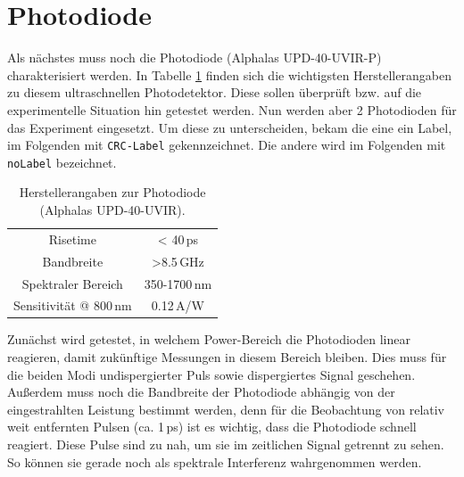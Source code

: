 \documentclass[bachelor,       %
               twoside,        %
               BCOR10mm,       %
               english,ngerman, %
               ]{GAUBM}
\begin{document}
\section{Photodiode}
Als nächstes muss noch die Photodiode (Alphalas UPD-40-UVIR-P) charakterisiert werden.
In Tabelle \ref{tab:PD} finden sich die wichtigsten Herstellerangaben zu diesem ultraschnellen Photodetektor.
Diese sollen überprüft bzw. auf die experimentelle Situation hin getestet werden.
Nun werden aber 2 Photodioden für das Experiment eingesetzt.
Um diese zu unterscheiden, bekam die eine ein Label, im Folgenden mit \texttt{CRC-Label} gekennzeichnet.
Die andere wird im Folgenden mit \texttt{noLabel} bezeichnet.
\begin{table}[!htb]
	\centering
	\begin{tabular}{|c|c|}
		\hline
		Risetime & < 40\,ps \\
		Bandbreite & >8.5\,GHz \\
		Spektraler Bereich & 350-1700\,nm \\
		Sensitivität @ 800\,nm & 0.12\,A/W\\
		\hline	
	\end{tabular}
	\caption{Herstellerangaben zur Photodiode {\scriptsize (Alphalas UPD-40-UVIR)}.}
	\label{tab:PD}
\end{table}
Zunächst wird getestet, in welchem Power-Bereich die Photodioden linear reagieren, damit zukünftige Messungen in diesem Bereich bleiben.
Dies muss für die beiden Modi undispergierter Puls sowie dispergiertes Signal geschehen.
Außerdem muss noch die Bandbreite der Photodiode abhängig von der eingestrahlten Leistung bestimmt werden, denn für die Beobachtung von relativ weit entfernten Pulsen (ca. 1\,ps) ist es wichtig, dass die Photodiode schnell reagiert.
Diese Pulse sind zu nah, um sie im zeitlichen Signal getrennt zu sehen.
So können sie gerade noch als spektrale Interferenz wahrgenommen werden.
\end{document}
